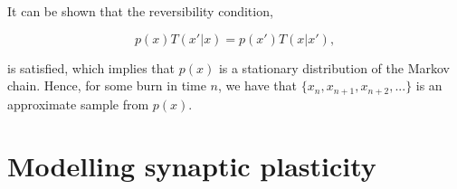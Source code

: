 It can be shown that the reversibility condition, 

\begin{equation}
    p(x)T(x'|x) = p(x')T(x|x'),
\end{equation} 

is satisfied, which implies that $p(x)$ is a stationary distribution of the Markov chain. Hence, for some burn in time $n$, we have that $\{x_n, x_{n+1}, x_{n+2},...\}$ is an approximate sample from $p(x)$.








\section{Modelling synaptic plasticity}
\label{sec:SP}

